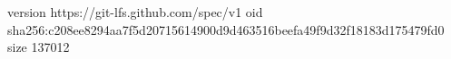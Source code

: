 version https://git-lfs.github.com/spec/v1
oid sha256:c208ee8294aa7f5d20715614900d9d463516beefa49f9d32f18183d175479fd0
size 137012
